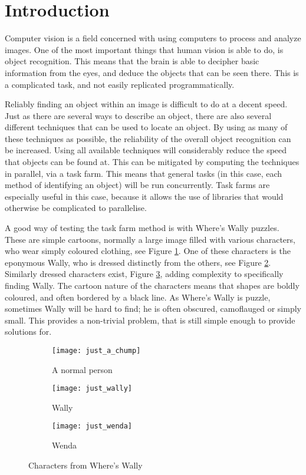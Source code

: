 \documentclass[../main.tex]{subfiles}
\begin{document}
  \section{Introduction}
    Computer vision is a field concerned with using computers to process and analyze images.
    One of the most important things that human vision is able to do, is object recognition.
    This means that the brain is able to decipher basic information from the eyes, and deduce the objects that can be seen there. %
    This is a complicated task, and not easily replicated programmatically.

    Reliably finding an object within an image is difficult to do at a decent speed.
    Just as there are several ways to describe an object, there are also several different techniques that can be used to locate an object.
    By using as many of these techniques as possible, the reliability of the overall object recognition can be increased.
    Using all available techniques will considerably reduce the speed that objects can be found at.
    This can be mitigated by computing the techniques in parallel, via a task farm.
    This means that general tasks (in this case, each method of identifying an object) will be run concurrently.
    Task farms are especially useful in this case, because it allows the use of libraries that would otherwise be complicated to parallelise.

    A good way of testing the task farm method is with Where's Wally puzzles.
    These are simple cartoons, normally a large image filled with various characters, who wear simply coloured clothing, see Figure \ref{justachump}.
    One of these characters is the eponymous Wally, who is dressed distinctly from the others, see Figure \ref{justwally}.
    Similarly dressed characters exist, Figure \ref{justwenda}, adding complexity to specifically finding Wally.
    The cartoon nature of the characters means that shapes are boldly coloured, and often bordered by a black line.
    As Where's Wally is puzzle, sometimes Wally will be hard to find; he is often obscured, camoflauged or simply small.
    This provides a non-trivial problem, that is still simple enough to provide solutions for.

    \begin{figure}[h]
    \centering
      \begin{subfigure}[b]{0.3\textwidth}
        \centering
        \texttt{[image: just\_a\_chump]}   
        \caption{A normal person}
        \label{justachump}
      \end{subfigure}
      \begin{subfigure}[b]{0.3\textwidth}
        \centering
        \texttt{[image: just\_wally]}   
        \caption{Wally}
        \label{justwally}
      \end{subfigure}
      \begin{subfigure}[b]{0.3\textwidth}
        \centering
        \texttt{[image: just\_wenda]}   
        \caption{Wenda}
        \label{justwenda}
      \end{subfigure}
    \caption{Characters from Where's Wally}
    \label{wallychars}
    \end{figure}
\end{document}
